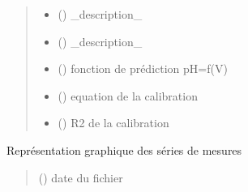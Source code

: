 \documentclass[letterpaper,10pt,french]{sphinxmanual}
\begin{document}
\begin{fulllineitems}
\begin{quote}
\begin{description}
\begin{itemize}
\item {} 
\sphinxAtStartPar
{} () \textendash{} \_description\_

\item {} 
\sphinxAtStartPar
{} () \textendash{} \_description\_

\item {} 
\sphinxAtStartPar
{} () \textendash{} fonction de prédiction pH=f(V)

\item {} 
\sphinxAtStartPar
{} () \textendash{} equation de la calibration

\item {} 
\sphinxAtStartPar
{} () \textendash{} R2 de la calibration

\end{itemize}

\end{description}\end{quote}

\end{fulllineitems}


\begin{fulllineitems}
\label{\detokenize{library:lib_pH.plot_mes}}
\pysigstartsignatures
\pysiglinewithargsret
{}
{}
{}
\pysigstopsignatures
\sphinxAtStartPar
Représentation graphique des séries de mesures
\begin{quote}\begin{description}
\sphinxAtStartPar
{} () \textendash{} date du fichier

\end{description}\end{quote}

\end{fulllineitems}
\end{document}
